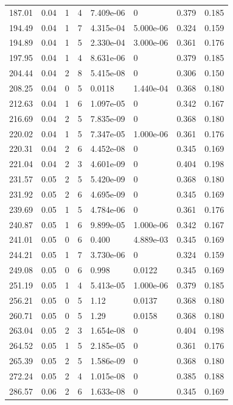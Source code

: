 \documentclass[preview]{standalone}
\begin{document}
{{{\begin{tabular}{L{1.2cm}C{1.2cm} C{0.3cm}C{0.5cm} C{1.4cm}C{1.4cm} C{1.4cm}C{1.4cm}}
  187.01  &  0.04  & 1     &  4 &  7.409e-06  & 0  & 0.379 &  0.185   \\ 
  194.49  &  0.04  & 1     &  7 &  4.315e-04  & 5.000e-06  & 0.324 &  0.159   \\ 
  194.89  &  0.04  & 1     &  5 &  2.330e-04  & 3.000e-06  & 0.361 &  0.176   \\ 
  197.95  &  0.04  & 1     &  4 &  8.631e-06  & 0  & 0.379 &  0.185   \\ 
  204.44  &  0.04  & 2     &  8 &  5.415e-08  & 0  & 0.306 &  0.150   \\ 
  208.25  &  0.04  & 0     &  5 &  0.0118  & 1.440e-04  & 0.368 &  0.180   \\ 
  212.63  &  0.04  & 1     &  6 &  1.097e-05  & 0  & 0.342 &  0.167   \\ 
  216.69  &  0.04  & 2     &  5 &  7.835e-09  & 0  & 0.368 &  0.180   \\ 
  220.02  &  0.04  & 1     &  5 &  7.347e-05  & 1.000e-06  & 0.361 &  0.176   \\ 
  220.31  &  0.04  & 2     &  6 &  4.452e-08  & 0  & 0.345 &  0.169   \\ 
  221.04  &  0.04  & 2     &  3 &  4.601e-09  & 0  & 0.404 &  0.198   \\ 
  231.57  &  0.05  & 2     &  5 &  5.420e-09  & 0  & 0.368 &  0.180   \\ 
  231.92  &  0.05  & 2     &  6 &  4.695e-09  & 0  & 0.345 &  0.169   \\ 
  239.69  &  0.05  & 1     &  5 &  4.784e-06  & 0  & 0.361 &  0.176   \\ 
  240.87  &  0.05  & 1     &  6 &  9.899e-05  & 1.000e-06  & 0.342 &  0.167   \\ 
  241.01  &  0.05  & 0     &  6 &  0.400  & 4.889e-03  & 0.345 &  0.169   \\ 
  244.21  &  0.05  & 1     &  7 &  3.730e-06  & 0  & 0.324 &  0.159   \\ 
  249.08  &  0.05  & 0     &  6 &  0.998  & 0.0122  & 0.345 &  0.169   \\ 
  251.19  &  0.05  & 1     &  4 &  5.413e-05  & 1.000e-06  & 0.379 &  0.185   \\ 
  256.21  &  0.05  & 0     &  5 &  1.12  & 0.0137  & 0.368 &  0.180   \\ 
  260.71  &  0.05  & 0     &  5 &  1.29  & 0.0158  & 0.368 &  0.180   \\ 
  263.04  &  0.05  & 2     &  3 &  1.654e-08  & 0  & 0.404 &  0.198   \\ 
  264.52  &  0.05  & 1     &  5 &  2.185e-05  & 0  & 0.361 &  0.176   \\ 
  265.39  &  0.05  & 2     &  5 &  1.586e-09  & 0  & 0.368 &  0.180   \\ 
  272.24  &  0.05  & 2     &  4 &  1.015e-08  & 0  & 0.385 &  0.188   \\ 
  286.57  &  0.06  & 2     &  6 &  1.633e-08  & 0  & 0.345 &  0.169   \\ 
\hline 
\end{tabular} 

}}}
\end{document}
